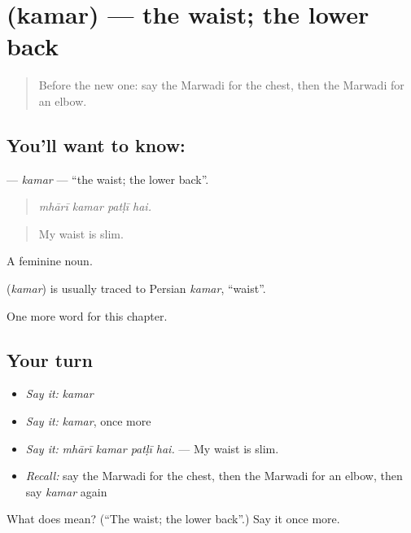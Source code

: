 \section[\texorpdfstring{\mw{कमर} (kamar)}{कमर (kamar)}]{ (kamar) — the waist; the lower back}

\label{lesson:MW-C251-kamar}



\begin{quote}
Before the new one: say the Marwadi for the chest, then the Marwadi for an elbow.
\end{quote}

\subsection*{You'll want to know: }
\textbf{} — \emph{kamar} — \textquotedblleft{}the waist; the lower back\textquotedblright{}.

\begin{quote}
   
\end{quote}

\begin{quote}
\emph{mhārī kamar patḷī hai.}
\end{quote}

\begin{quote}
My waist is slim.
\end{quote}

A feminine noun.

\begin{cousinweb}
\textbf{} (\emph{kamar}) is usually traced to Persian \emph{kamar}, \textquotedblleft{}waist\textquotedblright{}.
\end{cousinweb}

\begin{grammarlens}[title={What you've built}]
One more word for this chapter.
\end{grammarlens}

\subsection*{Your turn}
\begin{itemize}
\raggedright
  \item \emph{Say it:} \emph{kamar}
  \item \emph{Say it:} \emph{kamar}, once more
  \item \emph{Say it:} \emph{mhārī kamar patḷī hai.} — My waist is slim.
  \item \emph{Recall:} say the Marwadi for the chest, then the Marwadi for an elbow, then say \emph{kamar} again
\end{itemize}

\begin{tcolorbox}[breakable,colback=teal!4,colframe=teal!35!black,title={Before you move on}]
What does  mean? (\textquotedblleft{}The waist; the lower back\textquotedblright{}.) Say it once more.
\end{tcolorbox}
